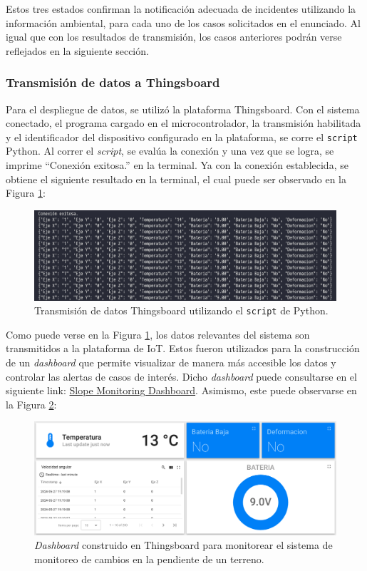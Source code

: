 Estos tres estados confirman la notificación adecuada de incidentes utilizando la información ambiental, para cada uno de los casos solicitados en el enunciado. Al igual que con los resultados de transmisión, los casos anteriores podrán verse reflejados en la siguiente sección. 

\subsubsection{Transmisión de datos a Thingsboard}

Para el despliegue de datos, se utilizó la plataforma Thingsboard. Con el sistema conectado, el programa cargado en el microcontrolador, la transmisión habilitada y el identificador del dispositivo configurado en la plataforma, se corre el \texttt{script} Python. Al correr el \textit{script}, se evalúa la conexión y una vez que se logra, se imprime ``Conexión exitosa.'' en la terminal. Ya con la conexión establecida, se obtiene el siguiente resultado en la terminal, el cual puede ser observado en la Figura \ref{fig:CONE}: 

\begin{figure}[H]
\centering
\includegraphics[width=155mm]{./Figuras/Desarrollo_Analisis/CONE}
\caption{Transmisión de datos Thingsboard utilizando el \texttt{script} de Python.} 
\label{fig:CONE}
\end{figure}

Como puede verse en la Figura \ref{fig:CONE}, los datos relevantes del sistema son transmitidos a la plataforma de IoT. Estos fueron utilizados para la construcción de un \textit{dashboard} que permite visualizar de manera más accesible los datos y controlar las alertas de casos de interés. Dicho \textit{dashboard} puede consultarse en el siguiente link: \href{https://iot.eie.ucr.ac.cr/dashboard/dfa4a2d0-184a-11ef-b343-e18dce159afc?publicId=f5fe9880-9148-11ee-9eb1-4f281083cad4}{Slope Monitoring Dashboard}. Asimismo, este puede observarse en la Figura \ref{fig:DSBD}: 

\begin{figure}[H]
\centering
\includegraphics[width=155mm]{./Figuras/Desarrollo_Analisis/DSBD}
\caption{\textit{Dashboard} construido en Thingsboard para monitorear el sistema de monitoreo de cambios en la pendiente de un terreno.} 
\label{fig:DSBD}
\end{figure}

